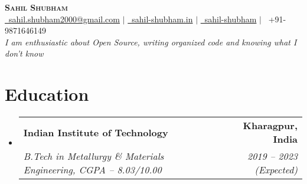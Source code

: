 \documentclass[letterpaper,11pt]{article}
\makeatletter
\newcommand{\resumeSubheading}[4]{
  \vspace{-2pt}\item
    \begin{tabular*}{1.0\textwidth}[t]{l@{\extracolsep{\fill}}r}
      \textbf{#1} & \textbf{\small #2} \\
      \textit{\small#3} & \textit{\small #4} \\
    \end{tabular*}\vspace{-7pt}
}
\newcommand{\resumeSubHeadingListStart}{\begin{itemize}[leftmargin=0.0in, label={}]}
\newcommand{\resumeSubHeadingListEnd}{\end{itemize}}
\makeatother
\begin{document}
\begin{center}
  \textbf{\Huge \scshape Sahil Shubham} \\ \vspace{1pt}
  \small \href{mailto:sahil.shubham2000@gmail.com}{\faEnvelope \, sahil.shubham2000@gmail.com} $|$ 
    \href{https://sahil-shubham.in}{\faLink \, sahil-shubham.in} $|$
    \href{https://github.com/sahil-shubham}{\faGithub \, sahil-shubham} $|$
    {\faPhone \, +91-9871646149} \\ \vspace{5pt}
   \emph{I am enthusiastic about Open Source, writing organized code and knowing what I don’t know} \\ \vspace{-5pt}
\end{center}


\section{Education}
\resumeSubHeadingListStart
\resumeSubheading
{Indian Institute of Technology}{Kharagpur, India}
{B.Tech in Metallurgy \& Materials Engineering, CGPA -- 8.03/10.00} {2019 -- 2023 (Expected)}
\resumeSubHeadingListEnd


\end{document}

